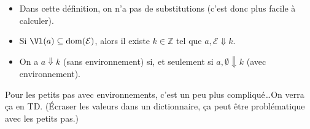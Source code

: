 \documentclass[../main]{subfiles}
\begin{document}
  \begin{rmk}
    \begin{itemize}
      \item Dans cette définition, on n'a pas de substitutions (c'est donc plus facile à calculer).
      \item Si $\Vl(a) \subseteq \mathrm{dom}(\mathcal{E})$, alors il existe $k \in \mathds{Z}$ tel que $a, \mathcal{E} \Downarrow k$.
      \item On a $a\Downarrow k$ (sans environnement) si, et seulement si $a, \emptyset \Downarrow k$ (avec environnement).
    \end{itemize}
  \end{rmk}

  Pour les petits pas avec environnements, c'est un peu plus compliqué\ldots On verra ça en TD. (Écraser les valeurs dans un dictionnaire, ça peut être problématique avec les petits pas.)
\end{document}
